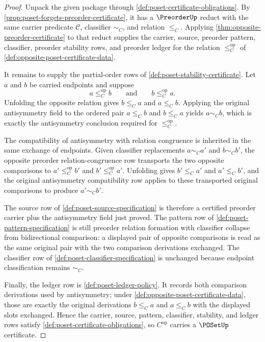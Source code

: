 \begin{proof}
Unpack the given package through \autoref{def:poset-certificate-obligations}. By \autoref{prop:poset-forgets-preorder-certificate}, it has a $\PreorderUp$ reduct with the same carrier predicate $\mathcal C$, classifier $\sim_C$, and relation $\le_C$. Applying \autoref{thm:opposite-preorder-certificate} to that reduct supplies the carrier, source, preorder pattern, classifier, preorder stability rows, and preorder ledger for the relation $\le_C^{\mathrm{op}}$ of \autoref{def:opposite-poset-certificate-data}.

It remains to supply the partial-order rows of \autoref{def:poset-stability-certificate}. Let $a$ and $b$ be carried endpoints and suppose
$$
a\le_C^{\mathrm{op}} b
\qquad\text{and}\qquad
b\le_C^{\mathrm{op}} a.
$$
Unfolding the opposite relation gives $b\le_C a$ and $a\le_C b$. Applying the original antisymmetry field to the ordered pair $a\le_C b$ and $b\le_C a$ yields $a\sim_C b$, which is exactly the antisymmetry conclusion required for $\le_C^{\mathrm{op}}$.

The compatibility of antisymmetry with relation congruence is inherited in the same exchange of endpoints. Given classifier replacements $a\sim_C a'$ and $b\sim_C b'$, the opposite preorder relation-congruence row transports the two opposite comparisons to $a'\le_C^{\mathrm{op}} b'$ and $b'\le_C^{\mathrm{op}} a'$. Unfolding gives $b'\le_C a'$ and $a'\le_C b'$, and the original antisymmetry compatibility row applies to these transported original comparisons to produce $a'\sim_C b'$.

The source row of \autoref{def:poset-source-specification} is therefore a certified preorder carrier plus the antisymmetry field just proved. The pattern row of \autoref{def:poset-pattern-specification} is still preorder relation formation with classifier collapse from bidirectional comparison: a displayed pair of opposite comparisons is read as the same original pair with the two comparison derivations exchanged. The classifier row of \autoref{def:poset-classifier-specification} is unchanged because endpoint classification remains $\sim_C$.

Finally, the ledger row is \autoref{def:poset-ledger-policy}. It records both comparison derivations used by antisymmetry; under \autoref{def:opposite-poset-certificate-data}, those are exactly the original derivations $b\le_C a$ and $a\le_C b$ with the displayed slots exchanged. Hence the carrier, source, pattern, classifier, stability, and ledger rows satisfy \autoref{def:poset-certificate-obligations}, so $C^{\mathrm{op}}$ carries a $\POSetUp$ certificate.
\end{proof}


